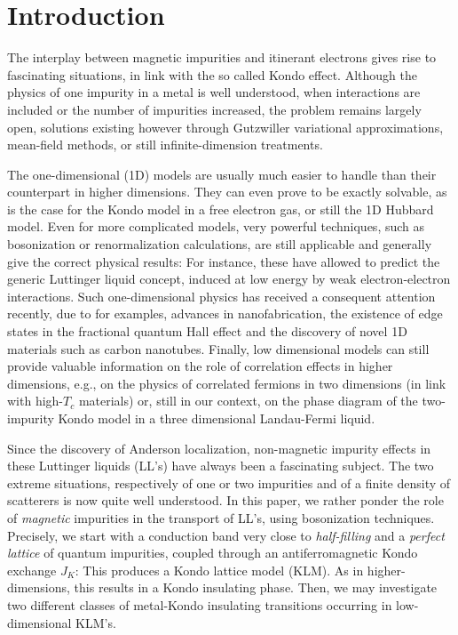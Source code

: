 \section{Introduction}

The interplay between magnetic impurities and itinerant electrons gives
rise to fascinating situations, in link with the so called Kondo 
effect\cite{Hewson-book}. Although the physics of one impurity 
in a metal is well understood\cite{Wilson}, 
when interactions are included or the number
of impurities increased, the problem remains largely open, solutions existing
however 
through Gutzwiller variational approximations\cite{Gutzwiller},
mean-field methods\cite{Bernard}, 
or still infinite-dimension treatments\cite{Georges-Kotliar}.

The one-dimensional (1D) models are usually much easier to handle than their
counterpart in higher dimensions. 
They can even prove to be exactly solvable, as
is the case for the Kondo model in 
a free electron gas\cite{Andrei}, or still the
1D Hubbard model\cite{Lieb-Wu}. 
Even for more complicated models, very powerful techniques,
such as bosonization or renormalization calculations, are still applicable
and generally give the correct physical results: For instance, 
these have allowed
to predict the generic Luttinger liquid concept\cite{Haldane,Schulz1}, induced
at low energy by weak electron-electron interactions. Such one-dimensional
physics
has received a 
consequent attention recently, due to for examples, advances in 
nanofabrication\cite{Tarucha}, the existence
of edge states in the fractional quantum Hall effect\cite{Tsui}
and the discovery of novel 1D materials such as 
carbon nanotubes\cite{Iijima}. Finally,
low dimensional
models can still provide valuable information on the role of correlation
effects in higher dimensions, e.g., on the physics of correlated fermions
in two dimensions (in link with high-$T_c$ materials) or, still
in our context,
on the phase diagram of the two-impurity
Kondo model in a three dimensional Landau-Fermi liquid\cite{Jones}.

Since the discovery of Anderson localization, non-magnetic
impurity effects in these Luttinger liquids (LL's) 
have always been a fascinating subject. The
two extreme situations, respectively of one or two impurities and
of a finite density of scatterers is now quite well understood\cite{Helene}. 
\vskip 0.05cm
In this paper, we
rather ponder the role of {\it magnetic} impurities in
the transport of LL's, using bosonization techniques. 
Precisely, we start with a conduction band very close to
\emph{half-filling} and a \emph{perfect lattice} of quantum impurities, coupled
through an antiferromagnetic Kondo exchange
$J_K$: This produces a Kondo lattice model (KLM).
As in higher-dimensions\cite{Aeppli}, this
results in a Kondo insulating phase\cite{Ueda_review}. 
Then, we may investigate
two different classes of
metal-Kondo insulating transitions occurring in 
low-dimensional KLM's. 

